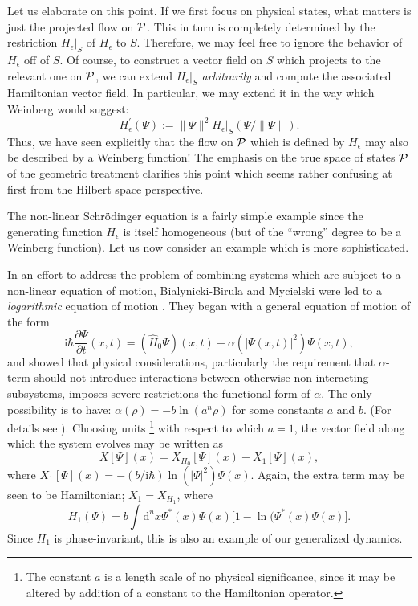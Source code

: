 \documentclass[12pt,aps,eqsecnum,tighten]{revtex4-2}
\def\be{\begin{equation}}
\def\ee{\end{equation}}
\def\d{{\mathrm d}}
\def\i{\mathrm{i}}
\def\P{{\cal P}}
\newcommand{\hvf}[1]{{X_{#1}}}
\begin{document}
Let us elaborate on this point. If we first focus on physical states,
what matters is just the projected flow on $\P$. This in turn is
completely determined by the restriction $H_\epsilon \big|_S$ of
$H_\epsilon$ to $S$. Therefore, we may feel free to ignore the
behavior of $H_\epsilon$ off of $S$.  Of course, to construct a vector
field on $S$ which projects to the relevant one on $\P$, we can extend
$H_\epsilon \big|_S$ {\em arbitrarily} and compute the associated
Hamiltonian vector field.  In particular, we may extend it in the way
which Weinberg would suggest:
%
\be H_\epsilon^\prime(\Psi) := \| \Psi \|^2 H_\epsilon 
\big|_S(\Psi / \|\Psi\|).  
\ee 
%
Thus, we have seen explicitly that the flow on $\P$ which is defined
by $H_\epsilon$ may also be described by a Weinberg function! The
emphasis on the true space of states $\P$ of the geometric treatment
clarifies this point which seems rather confusing at first from the 
Hilbert space perspective.

The non-linear Schr\"odinger equation is a fairly simple example since
the generating function $H_\epsilon$ is itself homogeneous (but of the
``wrong'' degree to be a Weinberg function).  Let us now consider an
example which is more sophisticated.

In an effort to address the problem of combining systems which are
subject to a non-linear equation of motion, Bialynicki-Birula and
Mycielski were led to a {\em logarithmic} equation of motion
\cite{birula}. They began with a general equation of motion of the
form
%
\be \label{gen_nonlin}
\i\hbar \frac{\partial \Psi}{\partial t}(x,t) =
(\hat{H}_0\Psi)(x,t) + \alpha( | \Psi(x,t) |^2 ) \Psi(x,t),
\ee
%
and showed that physical considerations, particularly the requirement
that $\alpha$-term should not introduce interactions between otherwise
non-interacting subsystems, imposes severe restrictions the functional
form of $\alpha$. The only possibility is to have: $\alpha(\rho) = -b
\ln(a^n\rho)$ for some constants $a$ and $b$. (For details see
\cite{birula}).  Choosing units%
%
\footnote{The constant $a$ is a length scale of no physical
significance, since it may be altered by addition of a constant to the
Hamiltonian operator.}
%
with respect to which $a=1$, the vector field along which the system
evolves may be written as 
%
\be X[\Psi](x) = \hvf{H_0}[\Psi](x) +X_1[\Psi](x), \ee 
%
where $X_1[\Psi](x) = -(b/\i\hbar) \ln(|\Psi|^2) \Psi(x)$.  Again, the
extra term may be seen to be Hamiltonian; $X_1 = \hvf{H_1}$, where 
%
\be
H_1(\Psi) = b \int \d^n \! x \Psi^*(x) \Psi(x) \big[ 1 - 
\ln(\Psi^*(x) \Psi(x) \big].  
\ee
%
Since $H_1$ is phase-invariant, this is also an example of our
generalized dynamics.
\end{document}
